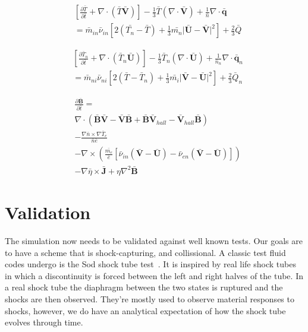 \documentclass[12pt,upcase]{umlthesis}
\begin{document}
\begin{equation}\label{eq:normtemperatureion}
	\begin{aligned}
		&[\frac{\partial\bar{T}}{\partial \bar{t}} + \nabla\cdot(\bar{T} \bar{\textbf{V}})] - \frac{1}{3}\bar{T} (\nabla\cdot\bar{\textbf{V}}) + \frac{1}{\bar{n}}\nabla\cdot\bar{\textbf{q}} \\
		& = \bar{m}_{in} \bar{\nu}_{in} [2(\bar{T_n} - \bar{T}) + \frac{1}{3}\bar{m_n} \lvert \bar{\textbf{U}} - \bar{\textbf{V}} \rvert^2 ] + \frac{2}{3}\bar{Q}
	\end{aligned}
\end{equation}

\begin{equation}\label{eq:normtemperatureneutral}
	\begin{aligned}
		&[\frac{\partial\bar{T}_n}{\partial \bar{t}} + \nabla\cdot(\bar{T}_n \bar{\textbf{U}})] - \frac{1}{3}\bar{T}_n (\nabla\cdot\bar{\textbf{U}}) + \frac{1}{\bar{n}_n}\nabla\cdot\bar{\textbf{q}}_n \\
		& = \bar{m}_{ni} \bar{\nu}_{ni} [2(\bar{T} - \bar{T}_n) + \frac{1}{3}\bar{m_i} \lvert \bar{\textbf{V}} - \bar{\textbf{U}} \rvert^2 ] + \frac{2}{3}\bar{Q}_n
	\end{aligned}
\end{equation}

\begin{equation}\label{eq:norminductionequation}
	\begin{aligned}
		& \frac{\partial\bar{\textbf{B}}}{\partial \bar{t}} = \\
		&\nabla\cdot(\bar{\textbf{B}}\bar{\textbf{V}}-\bar{\textbf{V}}\bar{\textbf{B}} + \bar{\textbf{B}}\bar{\textbf{V}}_{hall}-\bar{\textbf{V}}_{hall}\bar{\textbf{B}}) \\
		&-\frac{\nabla \bar{n} \times \nabla \bar{T}_e}{\bar{n}\bar{e}} \\
		&- \nabla\times(\frac{\bar{m_e}}{\bar{e}}[\bar{\nu}_{in} (\bar{\textbf{V}}-\bar{\textbf{U}}) - \bar{\nu}_{en}(\bar{\textbf{V}} - \bar{\textbf{U}})]) \\
		& - \nabla\bar{\eta}\times\bar{\textbf{J}} + \eta\nabla^2\bar{\textbf{B}}
\end{aligned}
\end{equation}


\section{Validation}\label{sec:validation}

The simulation now needs to be validated against well known tests. Our goals are to have a scheme that is shock-capturing, and collissional. A classic test fluid codes undergo is the Sod shock tube test~\citep{Sod1978}. It is inspired by real life shock tubes in which a discontinuity is forced between the left and right halves of the tube. In a real shock tube the diaphragm between the two states is ruptured and the shocks are then observed. They're mostly used to observe material responses to shocks, however, we do have an analytical expectation of how the shock tube evolves through time.
\end{document}
